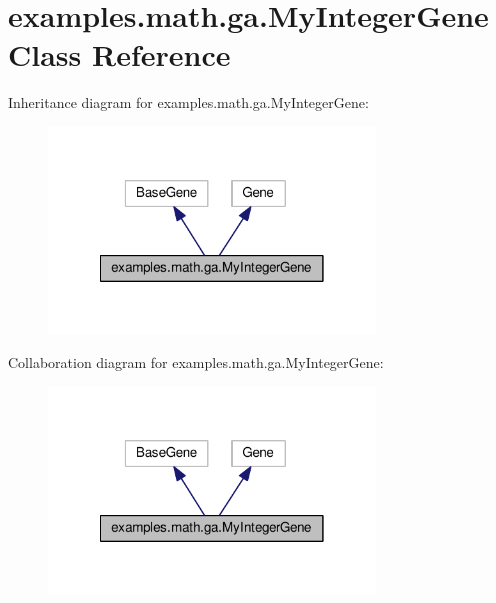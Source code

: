 \hypertarget{classexamples_1_1math_1_1ga_1_1_my_integer_gene}{\section{examples.\-math.\-ga.\-My\-Integer\-Gene Class Reference}
\label{classexamples_1_1math_1_1ga_1_1_my_integer_gene}
}


Inheritance diagram for examples.\-math.\-ga.\-My\-Integer\-Gene\-:
\nopagebreak
\begin{figure}[H]
\begin{center}
\leavevmode
\includegraphics[width=246pt]{classexamples_1_1math_1_1ga_1_1_my_integer_gene__inherit__graph}
\end{center}
\end{figure}


Collaboration diagram for examples.\-math.\-ga.\-My\-Integer\-Gene\-:
\nopagebreak
\begin{figure}[H]
\begin{center}
\leavevmode
\includegraphics[width=246pt]{classexamples_1_1math_1_1ga_1_1_my_integer_gene__coll__graph}
\end{center}
\end{figure}
